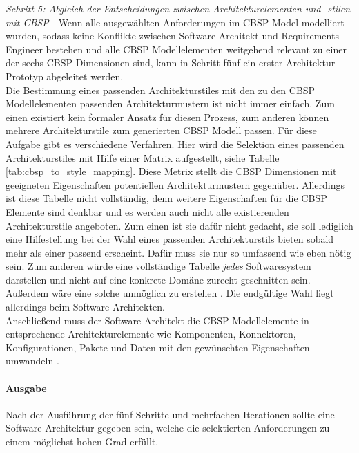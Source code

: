 \emph{Schritt 5: Abgleich der Entscheidungen zwischen Architekturelementen und -stilen mit CBSP} - 
Wenn alle ausgew\"ahlten Anforderungen im CBSP Model modelliert wurden, sodass keine Konflikte zwischen Software-Architekt und Requirements Engineer bestehen und alle CBSP Modellelementen weitgehend relevant zu einer der sechs CBSP Dimensionen sind, kann in Schritt f\"unf ein erster Architektur-Prototyp abgeleitet werden. \\
Die Bestimmung eines passenden Architekturstiles mit den zu den CBSP Modellelementen passenden Architekturmustern ist nicht immer einfach. Zum einen existiert kein formaler Ansatz f\"ur diesen Prozess, zum anderen k\"onnen mehrere Architekturstile zum generierten CBSP Modell passen. F\"ur diese Aufgabe gibt es verschiedene Verfahren. Hier wird die Selektion eines passenden Architekturstiles mit Hilfe einer Matrix aufgestellt, siehe Tabelle \ref{tab:cbsp_to_style_mapping}. Diese Metrix stellt die CBSP Dimensionen mit geeigneten Eigenschaften potentiellen Architekturmustern gegen\"uber. Allerdings ist diese Tabelle nicht vollst\"andig, denn weitere Eigenschaften f\"ur die CBSP Elemente sind denkbar und es werden auch nicht alle existierenden Architekturstile angeboten. Zum einen ist sie daf\"ur nicht gedacht, sie soll lediglich eine Hilfestellung bei der Wahl eines passenden Architekturstils bieten sobald mehr als einer passend erscheint. Daf\"ur muss sie nur so umfassend wie eben n\"otig sein. Zum anderen w\"urde eine vollst\"andige Tabelle \textit{jedes} Softwaresystem darstellen und nicht auf eine konkrete Dom\"ane zurecht geschnitten sein. Au\ss{}erdem w\"are eine solche unm\"oglich zu erstellen \cite{Gru01}. Die endg\"ultige Wahl liegt allerdings beim Software-Architekten. \\
Anschlie\ss{}end muss der Software-Architekt die CBSP Modellelemente in entsprechende Architekturelemente wie Komponenten, Konnektoren, Konfigurationen, Pakete und Daten mit den gew\"unschten Eigenschaften umwandeln \cite{Gru01}. \\

\paragraph{Ausgabe}

Nach der Ausf\"uhrung der f\"unf Schritte und mehrfachen Iterationen sollte eine Software-Architektur gegeben sein, welche die selektierten Anforderungen zu einem m\"oglichst hohen Grad erf\"ullt.






